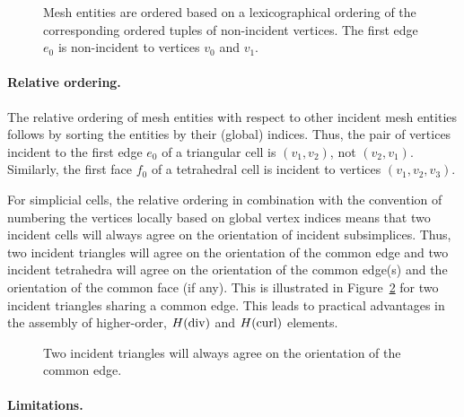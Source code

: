 \begin{figure}
  \begin{center}
    \caption{Mesh entities are ordered based on a lexicographical
      ordering of the corresponding ordered tuples of non-incident
      vertices. The first edge $e_0$ is non-incident to vertices $v_0$
      and $v_1$.}
    \label{fig:orderingexample,tetrahedron}
  \end{center}
\end{figure}

\paragraph{Relative ordering.}

The relative ordering of mesh entities with respect to other incident
mesh entities follows by sorting the entities by their (global)
indices. Thus, the pair of vertices incident to the first edge $e_0$
of a triangular cell is $(v_1, v_2)$, not $(v_2, v_1)$. Similarly, the
first face $f_0$ of a tetrahedral cell is incident to vertices $(v_1,
v_2, v_3)$.

For simplicial cells, the relative ordering in combination with the
convention of numbering the vertices locally based on global vertex
indices means that two incident cells will always agree on the
orientation of incident subsimplices. Thus, two incident triangles
will agree on the orientation of the common edge and two incident
tetrahedra will agree on the orientation of the common edge(s) and the
orientation of the common face (if any). This is illustrated in
Figure~\ref{fig:orientation_example_triangles} for two incident
triangles sharing a common edge. This leads to practical advantages in
the assembly of higher-order, $H(\mathrm{div})$ and $H(\mathrm{curl})$ elements.

\begin{figure}
\bwfig
  \begin{center}
    \caption{Two incident triangles will always agree on the
      orientation of the common edge.}
    \label{fig:orientation_example_triangles}
  \end{center}
\end{figure}

\paragraph{Limitations.}

